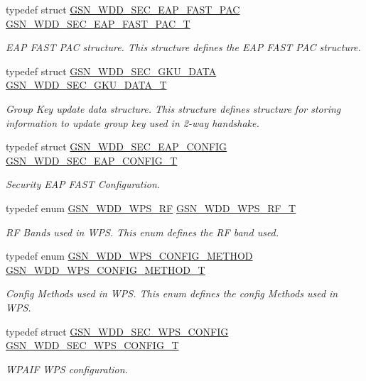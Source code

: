 \begin{DoxyCompactItemize}
typedef struct \hyperlink{a00288}{GSN\_\-WDD\_\-SEC\_\-EAP\_\-FAST\_\-PAC} \hyperlink{a00604_a7ad60b3114dc38d0bf169e200f3c81df}{GSN\_\-WDD\_\-SEC\_\-EAP\_\-FAST\_\-PAC\_\-T}
\begin{DoxyCompactList}\small\item\em EAP FAST PAC structure. This structure defines the EAP FAST PAC structure. \end{DoxyCompactList}\item 
typedef struct \hyperlink{a00291}{GSN\_\-WDD\_\-SEC\_\-GKU\_\-DATA} \hyperlink{a00604_af4786e836347b389816820cfbc8dc2a3}{GSN\_\-WDD\_\-SEC\_\-GKU\_\-DATA\_\-T}
\begin{DoxyCompactList}\small\item\em Group Key update data structure. This structure defines structure for storing information to update group key used in 2-\/way handshake. \end{DoxyCompactList}\item 
typedef struct \hyperlink{a00287}{GSN\_\-WDD\_\-SEC\_\-EAP\_\-CONFIG} \hyperlink{a00604_ae505f6660ee9d5572054b161a620bc52}{GSN\_\-WDD\_\-SEC\_\-EAP\_\-CONFIG\_\-T}
\begin{DoxyCompactList}\small\item\em Security EAP FAST Configuration. \end{DoxyCompactList}\item 
typedef enum \hyperlink{a00604_ab0a95842655918bdbd767751d8abb95d}{GSN\_\-WDD\_\-WPS\_\-RF} \hyperlink{a00604_a68fdeea2986eb4735ca5fcd6f45d3d1c}{GSN\_\-WDD\_\-WPS\_\-RF\_\-T}
\begin{DoxyCompactList}\small\item\em RF Bands used in WPS. This enum defines the RF band used. \end{DoxyCompactList}\item 
typedef enum \hyperlink{a00604_aaf56a679ef5989460c2d2bad97d4c353}{GSN\_\-WDD\_\-WPS\_\-CONFIG\_\-METHOD} \hyperlink{a00604_af1a232708dd0046ccf280fe0ce117171}{GSN\_\-WDD\_\-WPS\_\-CONFIG\_\-METHOD\_\-T}
\begin{DoxyCompactList}\small\item\em Config Methods used in WPS. This enum defines the config Methods used in WPS. \end{DoxyCompactList}\item 
typedef struct \hyperlink{a00296}{GSN\_\-WDD\_\-SEC\_\-WPS\_\-CONFIG} \hyperlink{a00604_a3186abec212969b8d5fd2f8c920bdc70}{GSN\_\-WDD\_\-SEC\_\-WPS\_\-CONFIG\_\-T}
\begin{DoxyCompactList}\small\item\em WPAIF WPS configuration. \end{DoxyCompactList}\item 

\end{DoxyCompactItemize}
